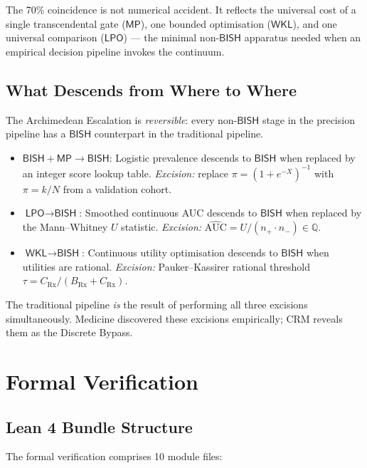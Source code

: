 \documentclass[11pt,a4paper]{article}
\theoremstyle{plain}
\theoremstyle{definition}
\newcommand{\BISH}{\textsf{BISH}}
\newcommand{\WKL}{\textsf{WKL}}
\newcommand{\LPO}{\textsf{LPO}}
\newcommand{\MP}{\textsf{MP}}
\newcommand{\Q}{\mathbb{Q}}
\begin{document}
The 70\% coincidence is not numerical accident.  It reflects the universal cost of a single transcendental gate ($\MP$), one bounded optimisation ($\WKL$), and one universal comparison ($\LPO$) --- the minimal non-$\BISH$ apparatus needed when an empirical decision pipeline invokes the continuum.

\subsection{What Descends from Where to Where}

The Archimedean Escalation is \emph{reversible}: every non-$\BISH$ stage in the precision pipeline has a $\BISH$ counterpart in the traditional pipeline.

\begin{itemize}[nosep]
\item $\BISH + \MP \to \BISH$: Logistic prevalence descends to $\BISH$ when replaced by an integer score lookup table. \emph{Excision:} replace $\pi = (1+e^{-X})^{-1}$ with $\pi = k/N$ from a validation cohort.
\item $\LPO \to \BISH$: Smoothed continuous AUC descends to $\BISH$ when replaced by the Mann--Whitney $U$ statistic. \emph{Excision:} $\widehat{\mathrm{AUC}} = U/(n_+ \cdot n_-) \in \Q$.
\item $\WKL \to \BISH$: Continuous utility optimisation descends to $\BISH$ when utilities are rational. \emph{Excision:} Pauker--Kassirer rational threshold $\tau = C_{\mathrm{Rx}}/(B_{\mathrm{Rx}} + C_{\mathrm{Rx}})$.
\end{itemize}

The traditional pipeline \emph{is} the result of performing all three excisions simultaneously.  Medicine discovered these excisions empirically; CRM reveals them as the Discrete Bypass.

\section{Formal Verification}\label{sec:lean}

\subsection{Lean 4 Bundle Structure}

The formal verification comprises 10 module files:
\end{document}
